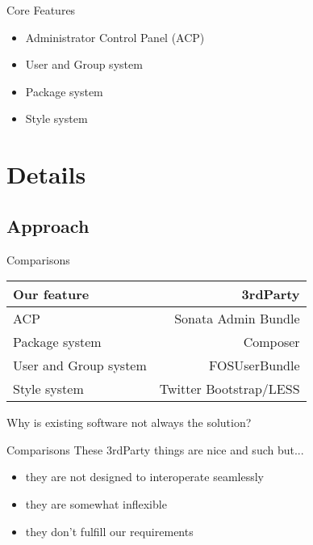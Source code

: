 \documentclass{beamer}
\begin{document}
	\begin{frame}{Core Features}
		\begin{itemize}
			\item Administrator Control Panel (ACP)
			\item User and Group system
			\item Package system
			\item Style system
		\end{itemize}
	\end{frame}
	
	\section{Details}
	\subsection{Approach}
	\begin{frame}{Comparisons}
		\begin{table}
			\begin{tabular}{l|r}
				Our feature & 3rdParty \\
				\hline
				ACP & Sonata Admin Bundle \\
				Package system & Composer \\
				User and Group system & FOSUserBundle \\
				Style system & Twitter Bootstrap/LESS
			\end{tabular}
		\end{table}
		
		\centering Why is existing software not always the solution?
	\end{frame}
	
	\begin{frame}{Comparisons}
		These 3rdParty things are nice and such but...
		\begin{itemize}
			 \item<2-> they are not designed to interoperate seamlessly
			 \item<3-> they are somewhat inflexible
			 \item<4-> they don't fulfill our requirements
		\end{itemize}
		
	\end{frame}
	
\end{document}
